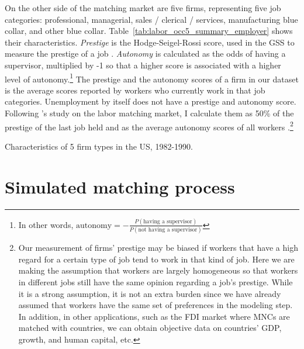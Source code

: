 On the other side of the matching market are five firms, representing five job categories:
professional, managerial, sales / clerical / services, manufacturing blue
collar, and other blue collar. Table~\ref{tab:labor_occ5_summary_employer} shows
their characteristics. \textit{Prestige} is the Hodge-Seigel-Rossi score, used
in the GSS to measure the prestige of a job \citep{Hodge1964,
  NORC2014}. \textit{Autonomy} is calculated as the odds of having a supervisor, multiplied
by -1 so that a higher score is associated with a higher level of
autonomy.\footnote{In other words, $\text{autonomy} = -\frac{P(\text{having a
      supervisor})}{P(\text{not having a supervisor})}$} The prestige and the
autonomy scores of a firm in our dataset is the average scores reported by
workers who currently work in that job categories. Unemployment by itself does
not have a prestige and autonomy score. Following \citet{Logan1996}'s study on
the labor matching market, I calculate them as 50\%
of the prestige of the last job held and as the average autonomy scores of all
workers \citep{Logan1996}.\footnote{Our measurement of firms' prestige may be
  biased if workers that have a high regard for a certain type of job tend to
  work in that kind of job. Here we are making the assumption that workers are
  largely homogeneous so that workers in different jobs still have the same
  opinion regarding a job's prestige. While it is a strong assumption, it is not
an extra burden since we have already assumed that workers have the same set
of preferences in the modeling step. In addition, in other applications, such
as the FDI market where MNCs are matched with countries, we can obtain objective
data on countries' GDP, growth, and human capital, etc.}

\begin{table}[tbp]
  \centering
  \caption[Characteristics of 5 firm types in the US, 1982-1990.]{Characteristics of 5 firm types in the US, 1982-1990.}
  \label{tab:labor_occ5_summary_employer}

\end{table}

\section{Simulated matching process}

